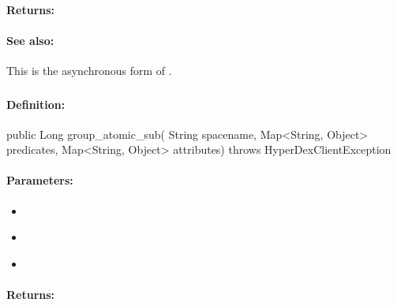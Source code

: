 \paragraph{Returns:}


\paragraph{See also:}  This is the asynchronous form of .

\pagebreak
\subsubsection{}
\label{api:java:group_atomic_sub}


\paragraph{Definition:}
\begin{javacode}
public Long group_atomic_sub(
        String spacename,
        Map<String, Object> predicates,
        Map<String, Object> attributes) throws HyperDexClientException
\end{javacode}

\paragraph{Parameters:}
\begin{itemize}[noitemsep]
\item {}\\

\item {}\\

\item {}\\

\end{itemize}

\paragraph{Returns:}


